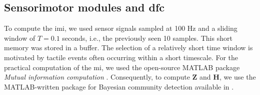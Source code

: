     
\subsection{Sensorimotor modules and \ac{dfc}}
To compute the \ac{imi}, we used sensor signals sampled at 100 Hz and a sliding window of $T = 0.1$ seconds, i.e., the previously seen 10 samples. This short memory was stored in a buffer. The selection of a relatively short time window is motivated by tactile events often occurring within a short timescale. For the practical computation of the \ac{mi}, we used the open-source MATLAB package \emph{Mutual information computation} \cite{PengMutualInformationcomputation}. Consequently, to compute $\bm{Z}$ and $\bm{H}$, we use the MATLAB-written package for Bayesian community detection available in \cite{Morup2025IRM}. 


